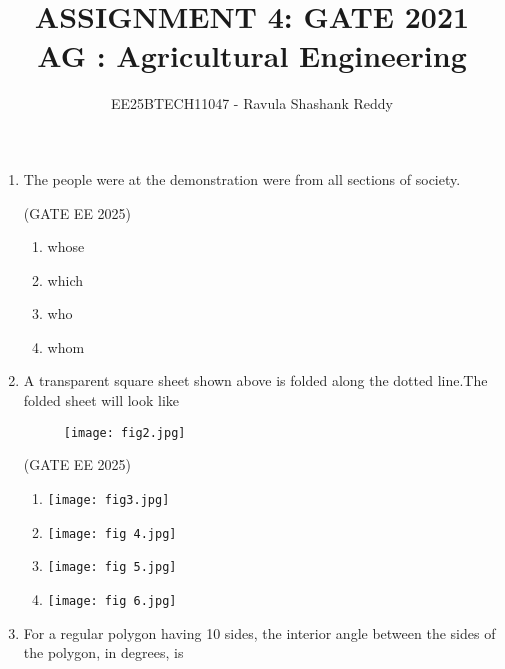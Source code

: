 \documentclass[journal,12pt,onecolumn]{IEEEtran}
\theoremstyle{remark}
\begin{document}
\title{
ASSIGNMENT 4: GATE 2021 \\
AG : Agricultural Engineering}
\author{EE25BTECH11047 - Ravula Shashank Reddy}
\maketitle
\renewcommand{\thefigure}{\theenumi}
\renewcommand{\thetable}{\theenumi}

\begin{enumerate}

\item The people  \underline{\hspace{2cm}} were at the demonstration were from all sections of society.

\hfill(GATE EE 2025)

\begin{multicols}{4}
\begin{enumerate} 
\item whose
\item which
\item who
\item whom
\end{enumerate} 
\end{multicols}


\item  A transparent square sheet shown above is folded along the dotted line.The folded sheet will look like \underline{\hspace{2cm}}
\begin{figure}[h]
    \centering
    \texttt{[image: fig2.jpg]}
    \caption{}
    \label{fig:placeholder}
\end{figure}
\hfill(GATE EE 2025)

\begin{enumerate}
    \item
        \texttt{[image: fig3.jpg]}
    \item 
        \texttt{[image: fig 4.jpg]}
    \item 
        \texttt{[image: fig 5.jpg]}
    \item 
        \texttt{[image: fig 6.jpg]}
        
\end{enumerate}

\item For a regular polygon having 10 sides, the interior angle between the sides of the polygon, in degrees, is  


\end{enumerate}
\end{document}
